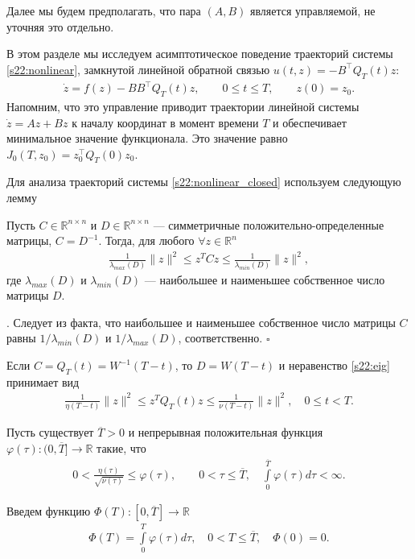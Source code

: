 \documentclass[../main.tex]{subfiles}
\begin{document}
Далее мы будем предполагать, что пара $(A,B)$ является управляемой, не уточняя это отдельно.

В этом разделе мы исследуем асимптотическое поведение траекторий системы \eqref{s22:nonlinear}, замкнутой линейной обратной связью $ u(t,z) = -B^{\top} Q_T(t) z$:
\begin{gather}\label{s22:nonlinear_closed}
    \dot{z} = f(z) - B B^{\top} Q_T(t) z, \qquad 0 \leqslant t \leqslant T, \qquad z(0) = z_0.
\end{gather}
Напомним, что это управление приводит траектории линейной системы $\dot{z} = A z + B z$ к началу координат в момент времени $T$ и обеспечивает минимальное значение функционала. 
Это значение равно $J_0(T,z_0) =z_0^{\top}Q_T(0)z_0$.

Для анализа траекторий системы \eqref{s22:nonlinear_closed} используем следующую лемму
\begin{lemma}\label{s22:lem:zqz} 
    Пусть $C\in \mathbb{R}^{ n \times n}$ и $D\in \mathbb{R}^{n \times n}$ --- симметричные положительно-определенные матрицы, $C=D^{-1}$. 
Тогда, для любого $\forall z \in \mathbb{R}^{n}$   
    \begin{gather} \label{s22:eig}
        \frac{1}{\lambda_{max}(D)} \|z\|^2 \leqslant z^T C z \leqslant \frac{1}{\lambda_{min}(D)} \|z\|^2,
    \end{gather}
    где $\lambda_{max}(D)$ и $\lambda_{min}(D)$ --- наибольшее и наименьшее собственное число матрицы $D$.
\end{lemma}
\doc. 
  Следует из факта, что наибольшее и наименьшее собственное число матрицы $C$ равны $1/{\lambda_{min}(D)}$ и $1/{\lambda_{max}(D)}$, соответственно. \hfill $ \square $

Если $C=Q_T(t)=W^{-1}(T-t)$, то $D=W(T-t)$ и неравенство \eqref{s22:eig} принимает вид
\begin{gather*} %
        \frac{1}{\eta(T-t)} \|z\|^2 \leqslant z^T Q_T(t) z \leqslant \frac{1}{\nu(T-t)} \|z\|^2, \quad 0\leqslant t < T.
    \end{gather*}
\begin{assumption} \label{s22:asm1}   
   Пусть существует $\overline{T}>0$ и непрерывная положительная функция $\varphi(\tau): (0, \overline{T}] \to \mathbb{R}$ такие, что
\begin{gather*}
    0 < \frac{\eta(\tau)}{\sqrt{\nu(\tau)}} \leqslant \varphi(\tau), \qquad 0 < \tau \leqslant \overline{T},\quad \int\limits_0^ {\overline{T}}\varphi(\tau) d\tau<\infty.
\end{gather*} 
\end{assumption}
Введем функцию $\Phi(T): [0, \overline{T}] \to \mathbb{R}$
\begin{gather*}
    \Phi(T)= \int\limits_0^ {T}\varphi(\tau) d\tau,\quad 0 <  T \leqslant \overline{T},\quad  \Phi(0)=0.
\end{gather*} 
\end{document}
